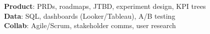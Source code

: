 \begin{itemize}[leftmargin=0.15in, label={}]
  \small{\item{\textbf{Product}{: PRDs, roadmaps, JTBD, experiment design, KPI trees} \\
  \textbf{Data}{: SQL, dashboards (Looker/Tableau), A/B testing} \\
  \textbf{Collab}{: Agile/Scrum, stakeholder comms, user research}}}
\end{itemize}